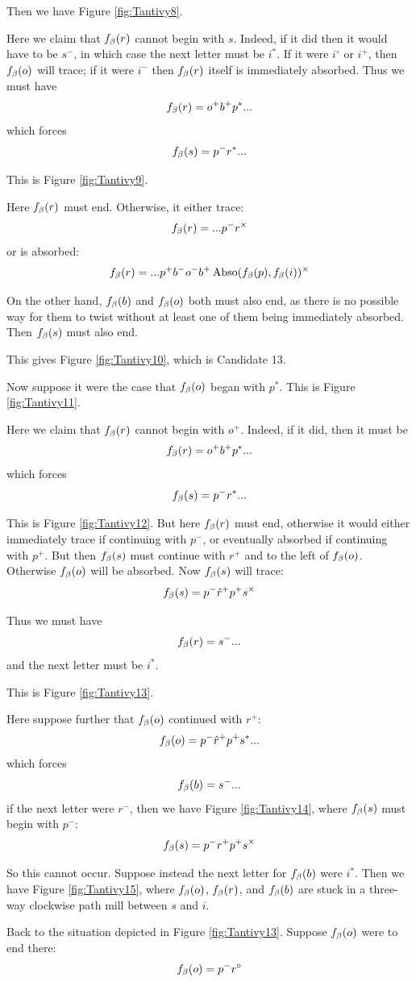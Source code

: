 Then we have Figure \ref{fig:Tantivy8}.

Here we claim that $f_\beta(r)$ cannot begin with $s$. Indeed, if it did then it would have to be $s^-$, in which case the next letter must be $i^*$. If it were $i^\circ$ or $i^+$, then $f_\beta(o)$ will trace; if it were $i^-$ then $f_\beta(r)$ itself is immediately absorbed. Thus we must have
$$f_\beta(r) = o^+ b^+ p^*...$$
which forces 
$$f_\beta(s) = p^- r^*...$$

This is Figure \ref{fig:Tantivy9}.

Here $f_\beta(r)$ must end. Otherwise, it either trace:
$$f_\beta(r) = ... p^-r^\times$$
or is absorbed:
$$f_\beta(r) = ... p^+ b^- o^- b^+\operatorname{Abso}(f_\beta(p), f_\beta(i))^\times$$

On the other hand, $f_\beta(b)$ and $f_\beta(o)$ both must also end, as there is no possible way for them to twist without at least one of them being immediately absorbed. Then $f_\beta(s)$ must also end.

This gives Figure \ref{fig:Tantivy10}, which is Candidate 13.

Now suppose it were the case that $f_\beta(o)$ began with $p^*$. This is Figure \ref{fig:Tantivy11}. 

Here we claim that $f_\beta(r)$ cannot begin with $o^+$. Indeed, if it did, then it must be
$$f_\beta(r) = o^+ b^+ p^*...$$
which forces
$$f_\beta(s) = p^- r^*...$$

This is Figure \ref{fig:Tantivy12}. But here $f_\beta(r)$ must end, otherwise it would either immediately trace if continuing with $p^-$, or eventually absorbed if continuing with $p^+$. But then $f_\beta(s)$ must continue with $r^+$ and to the left of $f_\beta(o)$. Otherwise $f_\beta(o)$ will be absorbed. Now $f_\beta(s)$ will trace:
$$f_\beta(s) = p^- \hat{r}^+ p^+ s^\times$$

Thus we must have
$$f_\beta(r) = s^-...$$
and the next letter must be $i^*$.

This is Figure \ref{fig:Tantivy13}.

Here suppose further that $f_\beta(o)$ continued with $r^+$:
$$f_\beta(o) = p^- \hat{r}^+p^+ s^*...$$
which forces
$$f_\beta(b) = s^-...$$
if the next letter were $r^-$, then we have Figure \ref{fig:Tantivy14}, where $f_\beta(s)$ must begin with $p^-$:
$$f_\beta(s) = p^- r^+ p^+ s^\times$$

So this cannot occur. Suppose instead the next letter for $f_\beta(b)$ were $i^*$. Then we have Figure \ref{fig:Tantivy15}, where $f_\beta(o)$, $f_\beta(r)$, and $f_\beta(b)$ are stuck in a three-way clockwise path mill between $s$ and $i$.

Back to the situation depicted in Figure \ref{fig:Tantivy13}. Suppose $f_\beta(o)$ were to end there:
$$f_\beta(o) = p^- r^\circ$$

